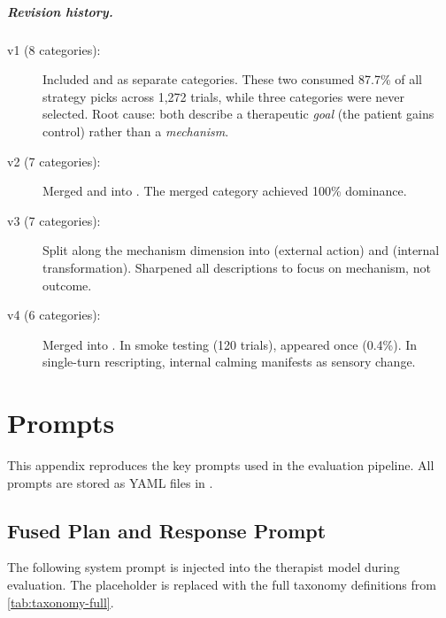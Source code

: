 \paragraph{Revision history.}
\begin{description}
  \item[v1 (8 categories):] Included  and
     as separate categories. These two consumed 87.7\% of
    all strategy picks across 1{,}272 trials, while three categories were
    never selected. Root cause: both describe a therapeutic \emph{goal}
    (the patient gains control) rather than a \emph{mechanism}.
  \item[v2 (7 categories):] Merged  and
     into . The merged category achieved
    100\% dominance.
  \item[v3 (7 categories):] Split  along the mechanism
    dimension into  (external action) and
     (internal transformation). Sharpened all
    descriptions to focus on mechanism, not outcome.
  \item[v4 (6 categories):] Merged  into
    . In smoke testing (120 trials),
     appeared once (0.4\%). In single-turn
    rescripting, internal calming manifests as sensory change.
\end{description}


\chapter{Prompts}
\label{app:prompts}

This appendix reproduces the key prompts used in the evaluation pipeline.
All prompts are stored as YAML files in .

\section{Fused Plan and Response Prompt}
\label{app:fused-prompt}

The following system prompt is injected into the therapist model during
evaluation. The  placeholder is replaced
with the full taxonomy definitions from \autoref{tab:taxonomy-full}.

